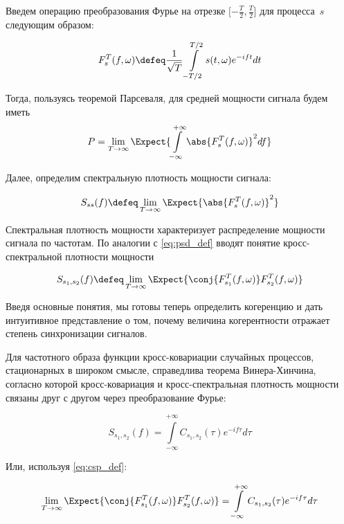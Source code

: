 Введем операцию преобразования Фурье на отрезке $\Big[{-\frac{T}{2}},\frac{T}{2}\Big]$
для процесса~$s$ следующим образом:

\begin{equation}
    F_s^T(f,\omega) \defeq \frac{1}{\sqrt{T}}\int\limits_{-T/2}^{T/2} s(t,\omega) e^{-ift} dt
\end{equation}

Тогда, пользуясь теоремой Парсеваля, для средней мощности сигнала будем иметь
\begin{equation}
    P = \lim_{T \to \infty} \Expect{\int\limits_{-\infty}^{+\infty}\abs{F_s^T(f,\omega)}^2df}
\end{equation}

Далее, определим спектральную плотность мощности сигнала:

\begin{equation}
    S_{ss}(f) \defeq \lim_{T \to \infty} \Expect{\abs{F_s^T(f,\omega)} ^ 2}
    \label{eq:psd_def}
\end{equation}

Спектральная плотность мощности характеризует распределение мощности сигнала по
частотам.  По аналогии с \ref{eq:psd_def} вводят понятие кросс-спектральной
плотности мощности

\begin{equation}
    S_{s_1,s_2}(f) \defeq \lim_{T \to \infty} \Expect{\conj{F_{s_1}^T(f,\omega)} F_{s_2}^T(f,\omega)}
    \label{eq:csp_def}
\end{equation}

Введя основные понятия, мы готовы теперь определить когеренцию и дать
интуитивное представление о том, почему величина когерентности отражает степень
синхронизации сигналов.

Для частотного образа функции кросс-ковариации случайных процессов,
стационарных в широком смысле, справедлива теорема Винера-Хинчина, согласно
которой кросс-ковариация и кросс-спектральная плотность мощности связаны друг с
другом через преобразование Фурье:

\begin{equation}
    S_{s_1, s_2}(f) = \int\limits_{-\infty}^{+\infty}C_{s_1,s_2}(\tau)e^{-if\tau}d\tau
\end{equation}

Или, используя \ref{eq:csp_def}:

\begin{equation}
    \lim_{T \to \infty} \Expect{\conj{F_{s_1}^T(f,\omega)} F_{s_2}^T(f,\omega)} =
    \int\limits_{-\infty}^{+\infty}C_{s_1,s_2}(\tau)e^{-if\tau}d\tau
\end{equation}

